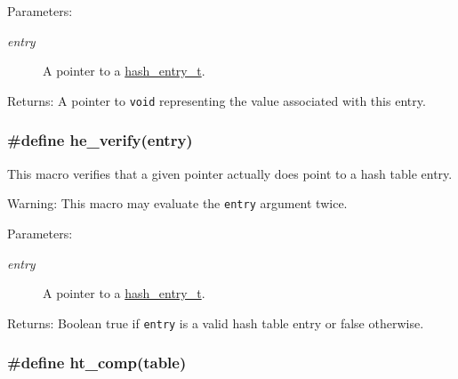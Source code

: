 \begin{Desc}
\item[Parameters:]
\begin{description}
\item[{\em entry}]A pointer to a \hyperlink{group__dbprim__hash_a1}{hash\_\-entry\_\-t}.\end{description}
\end{Desc}
\begin{Desc}
\item[Returns:]A pointer to {\tt void} representing the value associated with this entry. \end{Desc}
\hypertarget{group__dbprim__hash_a30}{
\subsubsection[he\_\-verify]{\setlength{\rightskip}{0pt plus 5cm}\#define he\_\-verify(entry)}}
\label{group__dbprim__hash_a30}


This macro verifies that a given pointer actually does point to a hash table entry.

\begin{Desc}
\item[Warning:]This macro may evaluate the {\tt entry} argument twice.\end{Desc}
\begin{Desc}
\item[Parameters:]
\begin{description}
\item[{\em entry}]A pointer to a \hyperlink{group__dbprim__hash_a1}{hash\_\-entry\_\-t}.\end{description}
\end{Desc}
\begin{Desc}
\item[Returns:]Boolean true if {\tt entry} is a valid hash table entry or false otherwise. \end{Desc}
\hypertarget{group__dbprim__hash_a25}{
\subsubsection[ht\_\-comp]{\setlength{\rightskip}{0pt plus 5cm}\#define ht\_\-comp(table)}}
\label{group__dbprim__hash_a25}


